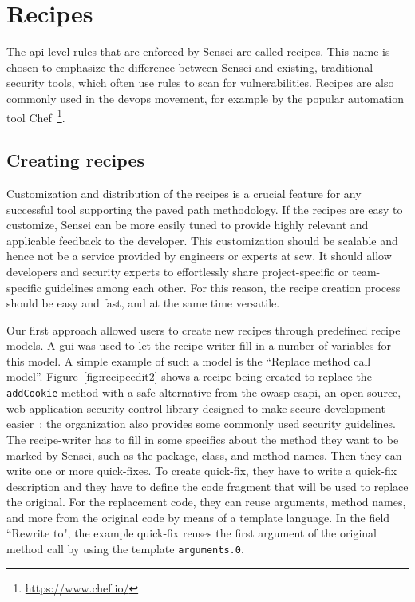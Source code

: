 \section{Recipes}

The \gls{api}-level rules that are enforced by Sensei are called recipes.
This name is chosen to emphasize the difference between Sensei and existing, traditional security tools, which often use rules to scan for vulnerabilities.
Recipes are also commonly used in the \gls{devops} movement, for example by the popular automation tool Chef~\footnote{\url{https://www.chef.io/}}.

\subsection{Creating recipes}
Customization and distribution of the recipes is a crucial feature for any successful tool supporting the paved path methodology.
If the recipes are easy to customize, Sensei can be more easily tuned to provide highly relevant and applicable feedback to the developer.
This customization should be scalable and hence not be a service provided by engineers or experts at \gls{scw}.
It should allow developers and security experts to effortlessly share project-specific or team-specific guidelines among each other.
For this reason, the recipe creation process should be easy and fast, and at the same time versatile. 

Our first approach allowed users to create new recipes through predefined recipe models.
A \gls{gui} was used to let the recipe-writer fill in a number of variables for this model.
A simple example of such a model is  the ``Replace method call model”.
Figure~\ref{fig:recipeedit2} shows a recipe being created to replace the \texttt{addCookie} method with a safe alternative from the \gls{owasp} \gls{esapi}, an open-source, web application security control library designed to make secure development easier~\cite{ESAPI}; the organization also provides some commonly used security guidelines.
The recipe-writer has to fill in some specifics about the method they want to be marked by Sensei, such as the package, class, and method names.
Then they can write one or more quick-fixes.
To create quick-fix, they have to write a quick-fix description and they have to define the code fragment that will be used to replace the original.
For the replacement code, they can reuse arguments, method names, and more from the original code by means of a template language.
In the field ``Rewrite to", the example quick-fix reuses the first argument of the original method call by using the template \texttt{arguments.0}. 


